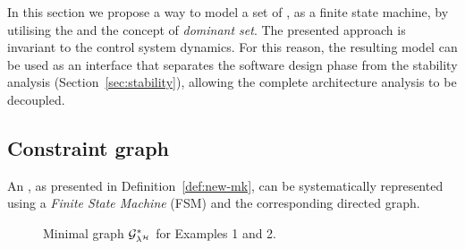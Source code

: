 In this section we propose a way to model a set of \ewhc{}\new{, $\Lambda$}, as a finite state machine, by utilising the  and the concept of \emph{dominant set}.
The presented approach is invariant to the control system dynamics. 
For this reason, the resulting model can be used as an interface that separates the software design phase from the stability analysis (Section~\ref{sec:stability}), allowing the complete architecture analysis to be decoupled.

\subsection{Constraint graph}%
\label{sec:constraint_graph}
%
An \ewhc{}, as presented in Definition~\ref{def:new-mk}, can be systematically represented using a \emph{Finite State Machine} (FSM) and the corresponding directed  graph.
%

\begin{figure}[t]
    \caption{Minimal graph $\mathcal{G}_{\lambda^{\mathcal{H}}}^*$ for Examples 1 and 2.}
    \label{fig:min-graph}
\end{figure}


